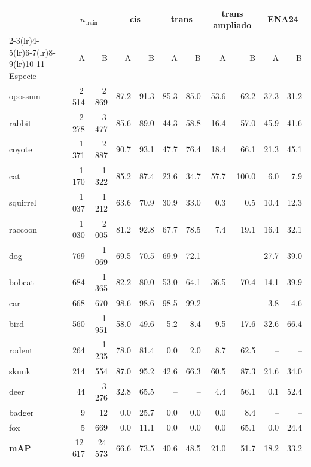 \begin{tabular}{lrrrrrrrrrr}
\toprule
 & \multicolumn{2}{c}{$n_{\mathrm{train}}$} & \multicolumn{2}{c}{cis} & \multicolumn{2}{c}{trans} & \multicolumn{2}{c}{trans ampliado} & \multicolumn{2}{c}{ENA24} \\ \cmidrule(lr){2-3}\cmidrule(lr){4-5}\cmidrule(lr){6-7}\cmidrule(lr){8-9}\cmidrule(lr){10-11}
Especie & A & B & A & B & A & B & A & B & A & B \\
\midrule
opossum & 2\,514 & 2\,869 & 87.2 & 91.3 & 85.3 & 85.0 & 53.6 & 62.2 & 37.3 & 31.2 \\
rabbit & 2\,278 & 3\,477 & 85.6 & 89.0 & 44.3 & 58.8 & 16.4 & 57.0 & 45.9 & 41.6 \\
coyote & 1\,371 & 2\,887 & 90.7 & 93.1 & 47.7 & 76.4 & 18.4 & 66.1 & 21.3 & 45.1 \\
cat & 1\,170 & 1\,322 & 85.2 & 87.4 & 23.6 & 34.7 & 57.7 & 100.0 & 6.0 & 7.9 \\
squirrel & 1\,037 & 1\,212 & 63.6 & 70.9 & 30.9 & 33.0 & 0.3 & 0.5 & 10.4 & 12.3 \\
raccoon & 1\,030 & 2\,005 & 81.2 & 92.8 & 67.7 & 78.5 & 7.4 & 19.1 & 16.4 & 32.1 \\
dog & 769 & 1\,069 & 69.5 & 70.5 & 69.9 & 72.1 & -- & -- & 27.7 & 39.0 \\
bobcat & 684 & 1\,365 & 82.2 & 80.0 & 53.0 & 64.1 & 36.5 & 70.4 & 14.1 & 39.9 \\
car & 668 & 670 & 98.6 & 98.6 & 98.5 & 99.2 & -- & -- & 3.8 & 4.6 \\
bird & 560 & 1\,951 & 58.0 & 49.6 & 5.2 & 8.4 & 9.5 & 17.6 & 32.6 & 66.4 \\
rodent & 264 & 1\,235 & 78.0 & 81.4 & 0.0 & 2.0 & 8.7 & 62.5 & -- & -- \\
skunk & 214 & 554 & 87.0 & 95.2 & 42.6 & 66.3 & 60.5 & 87.3 & 21.6 & 34.0 \\
deer & 44 & 3\,276 & 32.8 & 65.5 & -- & -- & 4.4 & 56.1 & 0.1 & 52.4 \\
badger & 9 & 12 & 0.0 & 25.7 & 0.0 & 0.0 & 0.0 & 8.4 & -- & -- \\
fox & 5 & 669 & 0.0 & 11.1 & 0.0 & 0.0 & 0.0 & 65.1 & 0.0 & 24.4 \\
\midrule
\textbf{mAP} & 12\,617 & 24\,573 & 66.6 & 73.5 & 40.6 & 48.5 & 21.0 & 51.7 & 18.2 & 33.2 \\
\bottomrule
\end{tabular}
